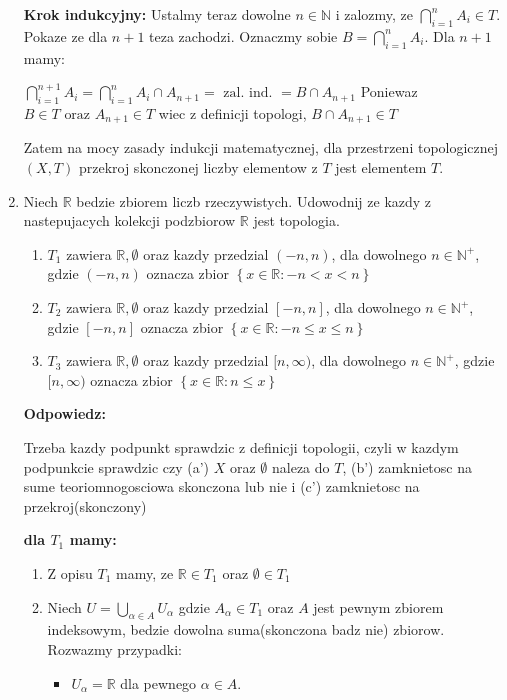 \documentclass{article}
\begin{document}
\begin{enumerate}
        \textbf{Krok indukcyjny:}
        Ustalmy teraz dowolne $n \in  \mathbb{N}$ i zalozmy, ze $\bigcap\limits_{i = 1}^{n}A_{i} \in T$. Pokaze ze dla $n+1$ teza zachodzi.
        Oznaczmy sobie $B = \bigcap\limits_{i = 1}^{n}A_{i}$.
        Dla $n+1$ mamy:

        $\bigcap\limits_{i = 1}^{n+1}A_{i} = \bigcap\limits_{i = 1}^{n}A_{i} \cap A_{n+1} = \text{ zal. ind. } = B \cap A_{n+1}$
        Poniewaz $B \in T \text{ oraz } A_{n+1} \in T$ wiec z definicji topologi, $B \cap A_{n+1} \in T$  

        Zatem na mocy zasady indukcji matematycznej, dla przestrzeni topologicznej $(X,T)$ przekroj skonczonej liczby elementow z $T$ jest elementem $T$.

    \item Niech $\mathbb{R}$ bedzie zbiorem liczb rzeczywistych. Udowodnij ze kazdy z nastepujacych kolekcji podzbiorow $\mathbb{R}$ jest topologia.

        \begin{enumerate}[label=(\alph*)]
            \item $T_{1}$ zawiera $\mathbb{R}, \emptyset$ oraz kazdy przedzial $(-n, n)$, dla dowolnego $n \in {\mathbb{N}}^{+}$, gdzie $(-n, n)$ oznacza zbior $\left\{x \in \mathbb{R}: -n < x <n\right\}$

            \item $T_{2}$ zawiera $\mathbb{R}, \emptyset$ oraz kazdy przedzial $[-n, n]$, dla dowolnego $n \in {\mathbb{N}}^{+}$, gdzie $[-n, n]$ oznacza zbior $\left\{x \in \mathbb{R}: -n \leq x \leq n\right\}$

            \item $T_{3}$ zawiera $\mathbb{R}, \emptyset$ oraz kazdy przedzial $[n, \infty)$, dla dowolnego $n \in {\mathbb{N}^{+}}$, gdzie $[n, \infty)$ oznacza zbior $\left\{x \in \mathbb{R}: n \leq x\right\}$

        \end{enumerate}

        \textbf{Odpowiedz:}

        Trzeba kazdy podpunkt sprawdzic z definicji topologii, czyli w kazdym podpunkcie sprawdzic czy (a') $X$ oraz $\emptyset$ naleza do $T$, (b') zamknietosc na sume teoriomnogosciowa skonczona lub nie i (c') zamknietosc na przekroj(skonczony)

        \textbf{dla $T_{1}$ mamy:}
        \begin{enumerate}[label=(\alph*')]
            \item Z opisu $T_{1}$ mamy, ze $ \mathbb{R} \in T_{1}$ oraz $\emptyset \in T_{1}$
            \item Niech $U = \bigcup\limits_{\alpha \in A} U_{\alpha}$ gdzie $A_{\alpha} \in T_{1}$ oraz $A$ jest pewnym zbiorem indeksowym, bedzie dowolna suma(skonczona badz nie) zbiorow. Rozwazmy przypadki:
                \begin{itemize}
                    \item $U_{\alpha} = \mathbb{R}$ dla pewnego $\alpha \in A$. 


\end{itemize}
\end{enumerate}
\end{enumerate}
\end{document}
